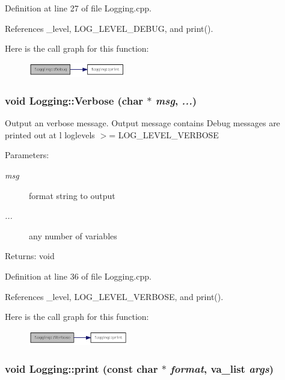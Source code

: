 Definition at line 27 of file Logging.cpp.

References \_\-level, LOG\_\-LEVEL\_\-DEBUG, and print().

Here is the call graph for this function:\nopagebreak
\begin{figure}[H]
\begin{center}
\leavevmode
\includegraphics[width=120pt]{class_logging_e0fcd9e5350d7b9158c8ae9289fef193_cgraph}
\end{center}
\end{figure}
\hypertarget{class_logging_2ae6a981ea685c851b87cf4c1ec2fb8f}{
\subsubsection[Verbose]{\setlength{\rightskip}{0pt plus 5cm}void Logging::Verbose (char $\ast$ {\em msg}, \/   {\em ...})}}
\label{class_logging_2ae6a981ea685c851b87cf4c1ec2fb8f}


Output an verbose message. Output message contains Debug messages are printed out at l loglevels $>$= LOG\_\-LEVEL\_\-VERBOSE

\begin{Desc}
\item[Parameters:]
\begin{description}
\item[{\em msg}]format string to output \item[{\em ...}]any number of variables \end{description}
\end{Desc}
\begin{Desc}
\item[Returns:]void \end{Desc}


Definition at line 36 of file Logging.cpp.

References \_\-level, LOG\_\-LEVEL\_\-VERBOSE, and print().

Here is the call graph for this function:\nopagebreak
\begin{figure}[H]
\begin{center}
\leavevmode
\includegraphics[width=124pt]{class_logging_2ae6a981ea685c851b87cf4c1ec2fb8f_cgraph}
\end{center}
\end{figure}
\hypertarget{class_logging_714840794950ab31df5da5b95322e391}{
\subsubsection[print]{\setlength{\rightskip}{0pt plus 5cm}void Logging::print (const char $\ast$ {\em format}, \/  va\_\-list {\em args})}}
\label{class_logging_714840794950ab31df5da5b95322e391}




